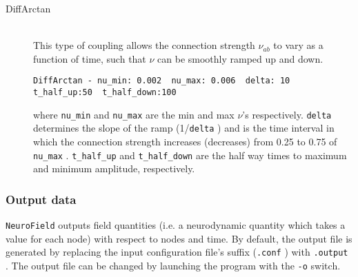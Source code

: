 \documentclass[12pt,a4paper]{article}
\newcommand{\type}[1]{{\small\small\tt #1} }
\newcommand{\NF}[0]{\type{NeuroField}}
\begin{document}
\begin{itemize}
\begin{description}
    \item[DiffArctan]\ \\
    This type of coupling allows the connection strength $\nu_{ab}$ to vary as a function of time, such that $\nu$ can be smoothly ramped up and down.
    \begin{lstlisting}
DiffArctan - nu_min: 0.002  nu_max: 0.006  delta: 10  t_half_up:50  t_half_down:100
    \end{lstlisting}
where \type{nu\_min} and \type{nu\_max} are the min and max $\nu$'s respectively. \type{delta} determines the slope of the ramp (1/\type{delta}) and is the time interval in which the connection strength increases (decreases) from 0.25 to 0.75 of \type{nu\_max}. \type{t\_half\_up} and \type{t\_half\_down} are the half way times to maximum and minimum  amplitude, respectively.

\end{description}
\end{itemize}

\subsubsection{Output data}
\label{sec:output_conf}

\NF outputs field quantities (i.e. a neurodynamic quantity which takes a value for each node) with respect to nodes and time. By default, the output file is generated by replacing the input configuration file's suffix (\type{.conf}) with \type{.output}. The output file can be changed by launching the program with the \type{-o} switch.
\end{document}
